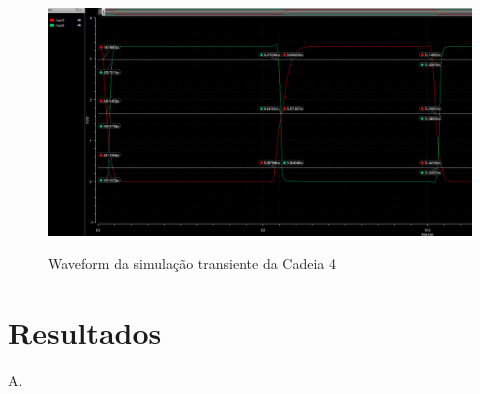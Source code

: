 \documentclass{iiufrgs}
\begin{document}
\begin{figure}[htbp]
    \centering
    \caption{Waveform da simulação transiente da Cadeia 4}
    \includegraphics[scale=0.4]{images/wave_ex4.png}
    \label{fig:wave4}
\end{figure}

\FloatBarrier

\chapter{Resultados}\label{resultados} %
A.



 
\end{document}
